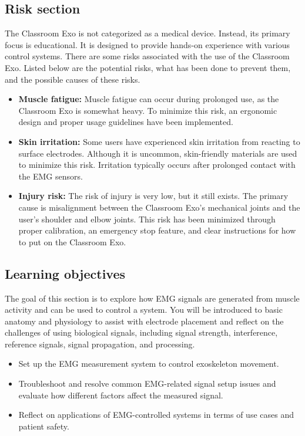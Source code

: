 \subsection{Risk section}
The Classroom Exo is not categorized as a medical device. Instead, its primary focus is educational. It is designed to provide hands-on experience with various control systems. There are some risks associated with the use of the Classroom Exo. Listed below are the potential risks, what has been done to prevent them, and the possible causes of these risks.
\begin{itemize}[]
	\item \textbf{Muscle fatigue:} Muscle fatigue can occur during prolonged use, as the Classroom Exo is somewhat heavy. To minimize this risk, an ergonomic design and proper usage guidelines have been implemented.
	\item \textbf{Skin irritation:} Some users have experienced skin irritation from reacting to surface electrodes. Although it is uncommon, skin-friendly materials are used to minimize this risk. Irritation typically occurs after prolonged contact with the EMG sensors.
	\item \textbf{Injury risk:} The risk of injury is very low, but it still exists. The primary cause is misalignment between the Classroom Exo's mechanical joints and the user's shoulder and elbow joints. This risk has been minimized through proper calibration, an emergency stop feature, and clear instructions for how to put on the Classroom Exo.
\end{itemize}
	
\subsection{Learning objectives}
The goal of this section is to explore how EMG signals are generated from muscle activity and can be used to control a system. You will be introduced to basic anatomy and physiology to assist with electrode placement and reflect on the challenges of using biological signals, including signal strength, interference, reference signals, signal propagation, and processing. 

\begin{itemize}[]
	\item Set up the EMG measurement system to control exoskeleton movement.
	\item Troubleshoot and resolve common EMG-related signal setup issues and evaluate how different factors affect the measured signal. 
	\item Reflect on applications of EMG-controlled systems in terms of use cases and patient safety. 
	
\end{itemize}
	
